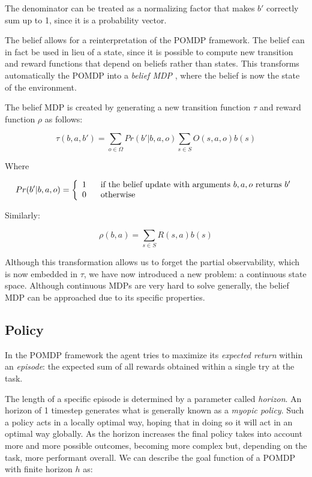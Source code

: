 The denominator can be treated as a normalizing factor that makes $b'$ correctly sum up to 1, since
it is a probability vector.

The belief allows for a reinterpretation of the POMDP framework. The belief can in fact be used in
lieu of a state, since it is possible to compute new transition and reward functions that depend on
beliefs rather than states. This transforms automatically the POMDP into a \textit{belief MDP}
\cite{cit:pomdp}, where the belief is now the state of the environment.

The belief MDP is created by generating a new transition function $\tau$ and reward function $\rho$
as follows:

\[ \tau(b,a,b') = \sum_{o\in \Omega} Pr(b' | b, a, o) \sum_{s\in S} O(s,a,o) b(s) \]

Where

\[Pr(b' | b, a, o) = \left\{
  \begin{array}{lr}
    1 \hspace{.6cm}\text{if the belief update with arguments $b,a,o$ returns $b'$}\\
    0 \hspace{.6cm}\text{otherwise}
  \end{array}
\right.
\]

Similarly:

\[ \rho(b,a) = \sum_{s\in S} R(s,a) b(s) \]

Although this transformation allows us to forget the partial observability, which is now embedded in
$\tau$, we have now introduced a new problem: a continuous state space. Although continuous MDPs are
very hard to solve generally, the belief MDP can be approached due to its specific properties.

\subsection{Policy}

In the POMDP framework the agent tries to maximize its \textit{expected return} within an
\textit{episode}: the expected sum of all rewards obtained within a single try at the task.

The length of a specific episode is determined by a parameter called \textit{horizon}. An horizon of
1 timestep generates what is generally known as a \textit{myopic policy}. Such a policy acts in a
locally optimal way, hoping that in doing so it will act in an optimal way globally. As the horizon
increases the final policy takes into account more and more possible outcomes, becoming more complex
but, depending on the task, more performant overall. We can describe the goal function of a POMDP
with finite horizon $h$ as:

